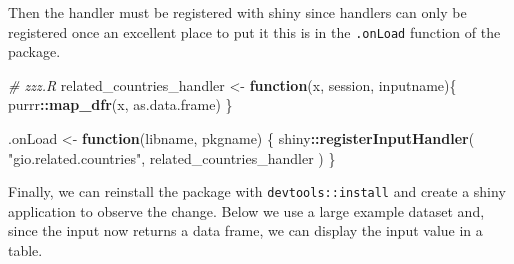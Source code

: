 \documentclass[
]{krantz}
\makeatletter
\newenvironment{Shaded}{\begin{snugshade}}{\end{snugshade}}
\newcommand{\CommentTok}[1]{\textcolor[rgb]{0.37,0.37,0.37}{\textit{#1}}}
\newcommand{\ControlFlowTok}[1]{\textcolor[rgb]{0.27,0.27,0.27}{\textbf{#1}}}
\newcommand{\KeywordTok}[1]{\textcolor[rgb]{0.27,0.27,0.27}{\textbf{#1}}}
\newcommand{\NormalTok}[1]{#1}
\newcommand{\OperatorTok}[1]{\textcolor[rgb]{0.43,0.43,0.43}{\textbf{#1}}}
\newcommand{\StringTok}[1]{\textcolor[rgb]{0.5,0.5,0.5}{#1}}
\newenvironment{kframe}{%
\medskip{}
\setlength{\fboxsep}{.8em}
 \def\at@end@of@kframe{}%
 \ifinner\ifhmode%
  \def\at@end@of@kframe{\end{minipage}}%
  \begin{minipage}{\columnwidth}%
 \fi\fi%
 \def\FrameCommand##1{\hskip\@totalleftmargin \hskip-\fboxsep
 \colorbox{shadecolor}{##1}\hskip-\fboxsep
     \hskip-\linewidth \hskip-\@totalleftmargin \hskip\columnwidth}%
 \MakeFramed {\advance\hsize-\width
   \@totalleftmargin\z@ \linewidth\hsize
   \@setminipage}}%
 {\par\unskip\endMakeFramed%
 \at@end@of@kframe}
\renewenvironment{Shaded}{\begin{kframe}}{\end{kframe}}
\makeatother
\begin{document}
Then the handler must be registered with shiny since handlers can only be registered once an excellent place to put it this is in the \texttt{.onLoad} function of the package.

\begin{Shaded}
\begin{Highlighting}[]
\CommentTok{\# zzz.R}
\NormalTok{related\_countries\_handler <{-}}\StringTok{ }\ControlFlowTok{function}\NormalTok{(x, session, inputname)\{}
\NormalTok{  purrr}\OperatorTok{::}\KeywordTok{map\_dfr}\NormalTok{(x, as.data.frame)}
\NormalTok{\}}

\NormalTok{.onLoad <{-}}\StringTok{ }\ControlFlowTok{function}\NormalTok{(libname, pkgname) \{}
\NormalTok{  shiny}\OperatorTok{::}\KeywordTok{registerInputHandler}\NormalTok{(}
    \StringTok{"gio.related.countries"}\NormalTok{, }
\NormalTok{    related\_countries\_handler}
\NormalTok{  )}
\NormalTok{\}}
\end{Highlighting}
\end{Shaded}

Finally, we can reinstall the package with \texttt{devtools::install} and create a shiny application to observe the change. Below we use a large example dataset and, since the input now returns a data frame, we can display the input value in a table.

\begin{Shaded}
\end{Shaded}
\end{document}
